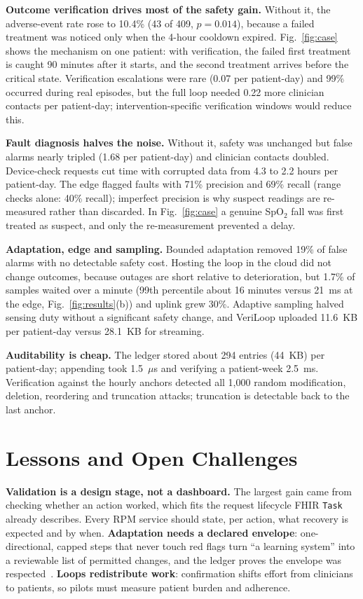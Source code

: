 \documentclass[journal,twoside,web]{IEEEmiot}
\begin{document}
\textbf{Outcome verification drives most of the safety gain.} Without it, the adverse-event rate rose to 10.4\% (43 of
409, $p=0.014$), because a failed treatment was noticed only when the 4-hour cooldown expired. Fig.~\ref{fig:case} shows the mechanism on one patient: with verification, the failed first treatment is caught 90 minutes after it starts, and the second treatment arrives before the critical state. Verification escalations
were rare (0.07 per patient-day) and 99\% occurred during real episodes, but the full loop needed 0.22 more clinician
contacts per patient-day; intervention-specific verification windows would reduce this.

\textbf{Fault diagnosis halves the noise.} Without it, safety was unchanged but false alarms nearly tripled (1.68 per
patient-day) and clinician contacts doubled. Device-check requests cut time with corrupted data from 4.3 to 2.2 hours per
patient-day. The edge flagged faults with 71\% precision and 69\% recall (range checks alone: 40\% recall); imperfect
precision is why suspect readings are re-measured rather than discarded. In Fig.~\ref{fig:case} a genuine SpO$_2$ fall was first treated as suspect, and only the re-measurement prevented a delay.

\textbf{Adaptation, edge and sampling.} Bounded adaptation removed 19\% of false alarms with no detectable safety
cost. Hosting the loop in the cloud did not change outcomes, because outages are short relative to deterioration, but
1.7\% of samples waited over a minute (99th percentile about 16 minutes versus 21~ms at the edge,
Fig.~\ref{fig:results}(b)) and uplink grew 30\%. Adaptive sampling halved sensing duty without a significant safety
change, and VeriLoop uploaded 11.6~KB per patient-day versus 28.1~KB for streaming.

\textbf{Auditability is cheap.} The ledger stored about 294 entries (44~KB) per patient-day; appending took 1.5~$\mu$s
and verifying a patient-week 2.5~ms. Verification against the hourly anchors detected all 1,000 random modification,
deletion, reordering and truncation attacks; truncation is detectable back to the last anchor.

\section{Lessons and Open Challenges}

\textbf{Validation is a design stage, not a dashboard.} The largest gain came from checking whether an action worked,
which fits the request lifecycle FHIR \texttt{Task} already describes. Every RPM service should state, per action, what
recovery is expected and by when. \textbf{Adaptation needs a declared envelope}: one-directional, capped steps that never
touch red flags turn ``a learning system'' into a reviewable list of permitted changes, and the ledger proves the
envelope was respected~\cite{fda2021}. \textbf{Loops redistribute work}: confirmation shifts effort from clinicians to
patients, so pilots must measure patient burden and adherence.
\end{document}
